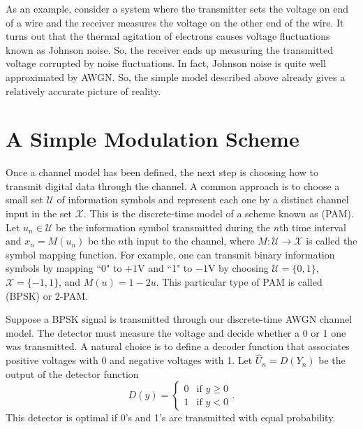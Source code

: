 As an example, consider a system where the transmitter sets the voltage on end of a wire and the receiver measures the voltage on the other end of the wire.
It turns out that the thermal agitation of electrons causes voltage fluctuations known as Johnson noise.
So, the receiver ends up measuring the transmitted voltage corrupted by noise fluctuations.
In fact, Johnson noise is quite well approximated by AWGN.
So, the simple model described above already gives a relatively accurate picture of reality.

\section{A Simple Modulation Scheme}

Once a channel model has been defined, the next step is choosing how to transmit digital data through the channel.
A common approach is to choose a small set $\mathcal{U}$ of information symbols and represent each one by a distinct channel input in the set $\mathcal{X}$.
This is the discrete-time model of a scheme known as  (PAM).
Let $u_n \in \mathcal{U}$ be the information symbol transmitted during the $n$th time interval and $x_n = M(u_n)$ be the $n$th input to the channel, where $M: \mathcal{U} \rightarrow \mathcal{X}$ is called the symbol mapping function.
For example, one can transmit binary information symbols by mapping ``0" to $+1$V and ``1" to $-1$V by choosing $\mathcal{U}=\{0,1\}$, $\mathcal{X}=\{-1,1\}$, and $M(u) = 1-2u$.
This particular type of PAM is called  (BPSK) or 2-PAM.

Suppose a BPSK signal is transmitted through our discrete-time AWGN channel model.
The detector must measure the voltage and decide whether a 0 or 1 one was transmitted.
A natural choice is to define a decoder function that associates positive voltages with 0 and negative voltages with 1.
Let $\hat{U}_n = D(Y_n)$ be the output of the detector function
\[ D(y) = \begin{cases} 0 & \text{if }y\geq0 \\ 1 & \text{if }y<0 \end{cases}. \]
This detector is optimal if 0's and 1's are transmitted with equal probability.

